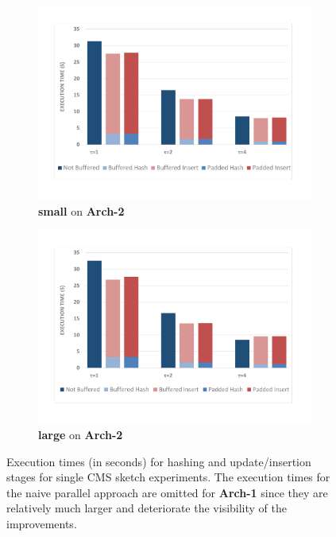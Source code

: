 \documentclass[10pt, conference, compsocconf]{IEEEtran}
\begin{document}
\begin{figure}[htbp]
\begin{subfigure}[t]{0.45\textwidth}
\includegraphics[width=\linewidth]{expfigs/8x211rasbpi.pdf}
\caption{{\bf small} on {\bf Arch-2}}
\label{fig:8x211arch2}
\end{subfigure}
\begin{subfigure}[t]{0.45\textwidth}\hspace*{2ex}
\includegraphics[width=\linewidth]{expfigs/8x2003rasbpi.pdf}
\caption{{\bf large} on {\bf Arch-2}}
\label{fig:8x2003arch2}
\end{subfigure}

\caption{Execution times (in seconds) for hashing and update/insertion stages for single CMS sketch experiments. The execution times for the naive parallel approach are omitted for {\bf Arch-1} since they are relatively much larger and deteriorate the visibility of the improvements.}
\label{fig:sum}
\end{figure}
\end{document}
